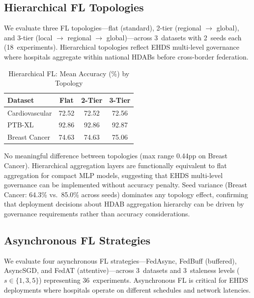 \documentclass[conference,a4paper]{IEEEtran}
\begin{document}
\subsection{Hierarchical FL Topologies}
\label{sec:hierarchical_fl}

We evaluate three FL topologies---flat (standard), 2-tier (regional $\to$ global), and 3-tier (local $\to$ regional $\to$ global)---across 3~datasets with 2~seeds each (18~experiments). Hierarchical topologies reflect EHDS multi-level governance where hospitals aggregate within national HDABs before cross-border federation.

\begin{table}[htbp]
\centering
\caption{Hierarchical FL: Mean Accuracy (\%) by Topology}
\label{tab:hierarchical_fl}
\begin{tabular}{lccc}
\toprule
Dataset & Flat & 2-Tier & 3-Tier \\
\midrule
Cardiovascular & 72.52 & 72.52 & 72.56 \\
PTB-XL & 92.86 & 92.86 & 92.87 \\
Breast Cancer & 74.63 & 74.63 & 75.06 \\
\bottomrule
\end{tabular}

\vspace{1mm}
\footnotesize{No meaningful difference between topologies (max range 0.44pp on Breast Cancer). Hierarchical aggregation layers are functionally equivalent to flat aggregation for compact MLP models, suggesting that EHDS multi-level governance can be implemented without accuracy penalty. Seed variance (Breast Cancer: 64.3\% vs.\ 85.0\% across seeds) dominates any topology effect, confirming that deployment decisions about HDAB aggregation hierarchy can be driven by governance requirements rather than accuracy considerations.}
\end{table}

\subsection{Asynchronous FL Strategies}
\label{sec:async_fl}

We evaluate four asynchronous FL strategies---FedAsync, FedBuff (buffered), AsyncSGD, and FedAT (attentive)---across 3~datasets and 3~staleness levels ($s \in \{1, 3, 5\}$) representing 36~experiments. Asynchronous FL is critical for EHDS deployments where hospitals operate on different schedules and network latencies.
\end{document}

